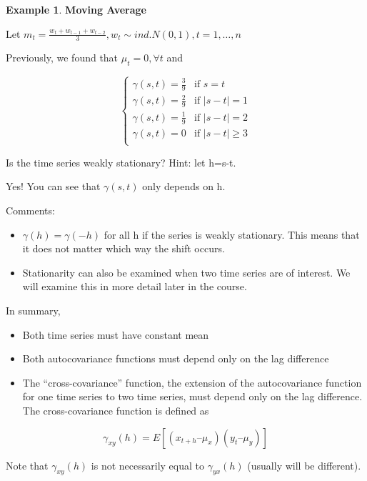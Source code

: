 \documentclass[
]{book}
\providecommand{\tightlist}{%
  \setlength{\itemsep}{0pt}\setlength{\parskip}{0pt}}
\theoremstyle{definition}
\theoremstyle{definition}
\newtheorem{example}{Example}[chapter]
\theoremstyle{definition}
\theoremstyle{definition}
\theoremstyle{remark}
\begin{document}
\begin{example}
\textbf{Moving Average}

Let \(m_t=\frac{w_t+w_{t-1}+w_{t-2}}{3}, w_t \sim ind. N(0,1 ), t=1,…,n\)

Previously, we found that \(\mu_t=0, \forall t\) and

\[\begin{cases}
  \gamma(s,t)= \frac{3}{9} & \text{if } s=t \\
  \gamma(s,t)= \frac{2}{9} & \text{if } |s-t|=1\\
  \gamma(s,t)= \frac{1}{9} & \text{if } |s-t|=2\\
  \gamma(s,t)= 0 & \text{if } |s-t|\ge 3\\
\end{cases}\]

Is the time series weakly stationary? Hint: let h=s-t.

Yes! You can see that \(\gamma(s,t)\) only depends on h.
\end{example}

Comments:

\begin{itemize}
\tightlist
\item
  \(\gamma(h) = \gamma(-h)\) for all h if the series is weakly stationary. This means that it does not matter which way the shift occurs.\\
\item
  Stationarity can also be examined when two time series are of interest. We will examine this in more detail later in the course.
\end{itemize}

In summary,

\begin{itemize}
\tightlist
\item
  Both time series must have constant mean
\item
  Both autocovariance functions must depend only on the lag difference
\item
  The ``cross-covariance'' function, the extension of the autocovariance function for one time series to two time series, must depend only on the lag difference. The cross-covariance function is defined as
\end{itemize}

\[\gamma_{xy}(h) = E[(x_{t+h} – \mu_x)(y_t – \mu_y)]\]

Note that \(\gamma_{xy}(h)\) is not necessarily equal to \(\gamma_{yx}(h)\) (usually will be different).
\end{document}
